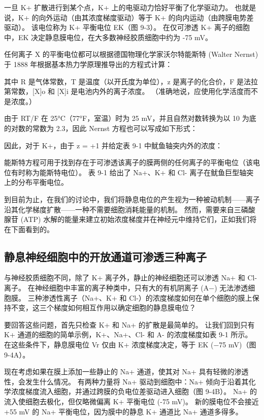 一旦 K+ 扩散进行到某个点，K+ 上的电驱动力恰好平衡了化学驱动力。 
也就是说，K+ 的向外运动（由其浓度梯度驱动）等于 K+ 的向内运动（由跨膜电势差驱动）。 
该电位称为 K+ 平衡电位 EK（图 9-3）。 
在仅可渗透 K+ 离子的细胞中，EK 决定静息膜电位，在大多数神经胶质细胞中约为 -75 mV。


任何离子 X 的平衡电位都可以根据德国物理化学家沃尔特能斯特 (Walter Nernst) 于 1888 年根据基本热力学原理推导出的方程式计算：


其中 R 是气体常数，T 是温度（以开氏度为单位），z 是离子的化合价，F 是法拉第常数，[X]o 和 [X]i 是电池内外的离子浓度。 
（准确地说，应使用化学活度而不是浓度。）


由于 RT/F 在 25°C（77°F，室温）时为 25 mV，并且自然对数转换为以 10 为底的对数的常数为 2.3，因此 Nernst 方程也可以写成如下形式：


因此，对于 K+，由于 z = +1 并给定表 9-1 中鱿鱼轴突内外的浓度：


能斯特方程可用于找到存在于可渗透该离子的膜两侧的任何离子的平衡电位（该电位有时称为能斯特电位）。 
表 9-1 给出了 Na+、K+ 和 Cl- 离子在鱿鱼巨型轴突上的分布平衡电位。


到目前为止，在我们的讨论中，我们将静息电位的产生视为一种被动机制——离子沿其化学梯度扩散——一种不需要细胞消耗能量的机制。 
然而，需要来自三磷酸腺苷 (ATP) 水解的能量来建立初始浓度梯度并在神经元中维持它们，正如我们将在下面看到的。




\subsection{静息神经细胞中的开放通道可渗透三种离子}
与神经胶质细胞不同，除了 K+ 离子外，静止的神经细胞还可以渗透 Na+ 和 Cl- 离子。 
在神经细胞中丰富的离子种类中，只有大的有机阴离子 (A−) 无法渗透细胞膜。 
三种渗透性离子（Na+、K+ 和 Cl-）的浓度梯度如何在单个细胞的膜上保持不变，这三个梯度如何相互作用以确定细胞的静息膜电位？


要回答这些问题，首先只检查 K+ 和 Na+ 的扩散是最简单的。 
让我们回到只有 K+ 通道的细胞的简单示例，K+、Na+、Cl- 和 A- 的浓度梯度如表 9-1 所示。 
在这些条件下，静息膜电位 Vr 仅由 K+ 浓度梯度决定，等于 EK (−75 mV)（图 9-4A）。


现在考虑如果在膜上添加一些静止的 Na+ 通道，使其对 Na+ 具有轻微的渗透性，会发生什么情况。 
有两种力量将 Na+ 驱动到细胞中：Na+ 倾向于沿着其化学浓度梯度流入细胞，并通过跨膜的负电位差驱动进入细胞（图 9-4B）。 
Na+ 的流入使细胞去极化，但仅略微偏离 K+ 平衡电位 (-75 mV)。 
新的膜电位不会接近 +55 mV 的 Na+ 平衡电位，因为膜中的静息 K+ 通道比 Na+ 通道多得多。


